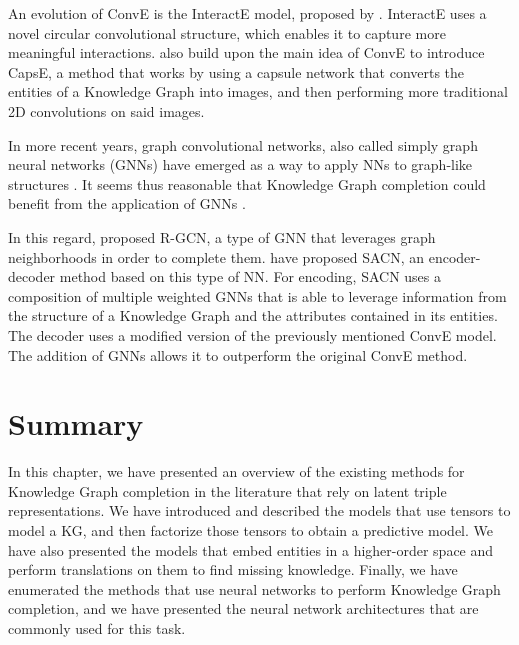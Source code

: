 An evolution of ConvE is the InteractE model, proposed by \citet{vashishth2020}. InteractE uses a novel circular convolutional structure, which enables it to capture more meaningful interactions. \citet{nguyen2019} also build upon the main idea of ConvE to introduce CapsE, a method that works by using a capsule network \cite{sabour2017} that converts the entities of a Knowledge Graph into images, and then performing more traditional 2D convolutions on said images.

In more recent years, graph convolutional networks, also called simply graph neural networks (GNNs) have emerged as a way to apply NNs to graph-like structures \cite{bruna2014, wu2021, zhou2020, kipf2017}. It seems thus reasonable that Knowledge Graph completion could benefit from the application of GNNs \cite{ye2022}. %

In this regard, \citet{schlichtkrull2018} proposed R-GCN, a type of GNN that leverages graph neighborhoods in order to complete them. \citet{shang2019} have proposed SACN, an encoder-decoder method based on this type of NN. For encoding, SACN uses a composition of multiple weighted GNNs that is able to leverage information from the structure of a Knowledge Graph and the attributes contained in its entities. The decoder uses a modified version of the previously mentioned ConvE model. The addition of GNNs allows it to outperform the original ConvE method.

\section{Summary}\label{sec:emb-summary}
In this chapter, we have presented an overview of the existing methods for Knowledge Graph completion in the literature that rely on latent triple representations. We have introduced and described the models that use tensors to model a KG, and then factorize those tensors to obtain a predictive model. We have also presented the models that embed entities in a higher-order space and perform translations on them to find missing knowledge. Finally, we have enumerated the methods that use neural networks to perform Knowledge Graph completion, and we have presented the neural network architectures that are commonly used for this task.